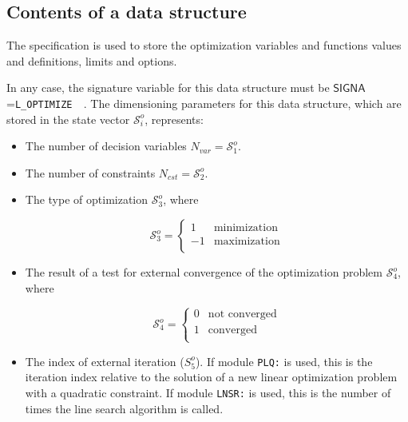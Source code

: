 \subsection{Contents of a  data structure}

The  specification is used to store the optimization variables and functions values and definitions, limits and
options.

\vskip 0.08cm

In any case, the signature variable for this data structure must be $\mathsf{SIGNA}$=\verb*|L_OPTIMIZE  |. The dimensioning
parameters for this data structure, which are stored in the state vector $\mathcal{S}^{o}_{i}$, represents:

\begin{itemize}
\item The number of decision variables $N_{var} = \mathcal{S}^{o}_{1}$.
\item The number of constraints $N_{cst} = \mathcal{S}^{o}_{2}$.
\item The type of optimization  $\mathcal{S}^{o}_{3}$, where

\begin{displaymath}
\mathcal{S}^{o}_{3} = \left\{
\begin{array}{rl}
 1 & \textrm{minimization} \\
 -1 & \textrm{maximization} \\
\end{array} \right.
\end{displaymath}

\item The result of a test for external convergence of the optimization problem $\mathcal{S}^{o}_{4}$, where

\begin{displaymath}
\mathcal{S}^{o}_{4} = \left\{
\begin{array}{rl}
 0 & \textrm{not converged} \\
 1 & \textrm{converged} \\
\end{array} \right.
\end{displaymath}

\item The index of external iteration (${S}^{o}_{5}$). If module {\tt PLQ:} is used, this is the iteration index relative to
the solution of a new linear optimization problem with a quadratic constraint. If module {\tt LNSR:} is used, this is the number
of times the line search algorithm is called.


\end{itemize}
